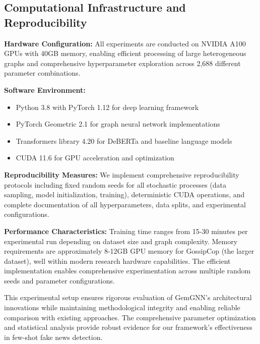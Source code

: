 \subsection{Computational Infrastructure and Reproducibility}

\textbf{Hardware Configuration:} All experiments are conducted on NVIDIA A100 GPUs with 40GB memory, enabling efficient processing of large heterogeneous graphs and comprehensive hyperparameter exploration across 2,688 different parameter combinations.

\textbf{Software Environment:}
\begin{itemize}
\item Python 3.8 with PyTorch 1.12 for deep learning framework
\item PyTorch Geometric 2.1 for graph neural network implementations
\item Transformers library 4.20 for DeBERTa and baseline language models
\item CUDA 11.6 for GPU acceleration and optimization
\end{itemize}

\textbf{Reproducibility Measures:} We implement comprehensive reproducibility protocols including fixed random seeds for all stochastic processes (data sampling, model initialization, training), deterministic CUDA operations, and complete documentation of all hyperparameters, data splits, and experimental configurations.

\textbf{Performance Characteristics:} Training time ranges from 15-30 minutes per experimental run depending on dataset size and graph complexity. Memory requirements are approximately 8-12GB GPU memory for GossipCop (the larger dataset), well within modern research hardware capabilities. The efficient implementation enables comprehensive experimentation across multiple random seeds and parameter configurations.

This experimental setup ensures rigorous evaluation of GemGNN's architectural innovations while maintaining methodological integrity and enabling reliable comparison with existing approaches. The comprehensive parameter optimization and statistical analysis provide robust evidence for our framework's effectiveness in few-shot fake news detection.

\EndChapter
